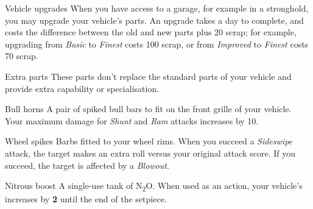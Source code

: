 \begin{abstractsection}{Vehicle upgrades}
  When you have access to a garage, for example in a stronghold, you may upgrade your vehicle's parts. An upgrade takes a day to complete, and costs the difference between the old and new parts plus 20 scrap; for example, upgrading from \emph{Basic} to \emph{Finest} costs 100 scrap, or from \emph{Improved} to \emph{Finest} costs 70 scrap.
\end{abstractsection}

\begin{abstractsection}{Extra parts}
These parts don't replace the standard parts of your vehicle and provide extra capability or specialisation.

\begin{describe}{Bull horns}
  A pair of spiked bull bars to fit on the front grille of your vehicle. Your maximum damage for \emph{Shunt} and \emph{Ram} attacks increases by 10.
\end{describe}

\begin{describe}{Wheel spikes}
  Barbs fitted to your wheel rims. When you succeed a \emph{Sideswipe} attack, the target makes an extra  roll versus your original attack score. If you succeed, the target is affected by a \emph{Blowout}.
\end{describe}

\begin{describe}{Nitrous boost}
  A single-use tank of N\textsubscript{2}O. When used as an action, your vehicle's  increases by \textbf{2} until the end of the setpiece.
\end{describe}

\end{abstractsection}
